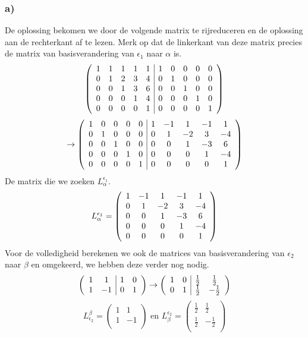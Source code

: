 \documentclass[lineaire_algebra_oplossingen.tex]{subfiles}
\begin{document}
\subsubsection*{a)}
De oplossing bekomen we door de volgende matrix te rijreduceren en de oplossing aan de rechterkant af te lezen. Merk op dat de linkerkant van deze matrix precies de matrix van basisverandering van $\epsilon_{1}$ naar $\alpha$ is.
\[
\left(
\begin{array}{c c c c c | c c c c c}
1 & 1 & 1 & 1 & 1 & 1 & 0 & 0 & 0 & 0\\ 
0 & 1 & 2 & 3 & 4 & 0 & 1 & 0 & 0 & 0\\ 
0 & 0 & 1 & 3 & 6 & 0 & 0 & 1 & 0 & 0\\ 
0 & 0 & 0 & 1 & 4 & 0 & 0 & 0 & 1 & 0\\ 
0 & 0 & 0 & 0 & 1 & 0 & 0 & 0 & 0 & 1\\ 
\end{array}
\right)
\]
\[
\rightarrow
\left(
\begin{array}{c c c c c | c c c c c}
1 & 0 & 0 & 0 & 0 & 1 & -1 & 1 & -1 & 1 \\ 
0 & 1 & 0 & 0 & 0 & 0 & 1 & -2 & 3 & -4\\ 
0 & 0 & 1 & 0 & 0 & 0 & 0 & 1 & -3 & 6\\ 
0 & 0 & 0 & 1 & 0 & 0 & 0 & 0 & 1 & -4\\ 
0 & 0 & 0 & 0 & 1 & 0 & 0 & 0 & 0 & 1\\ 
\end{array}
\right)
\]
De matrix die we zoeken $L_\alpha^{\epsilon_{1}}$.
\[
L_\alpha^{\epsilon_{1}}
=
\left(
\begin{array}{c c c c c}
1 & -1 & 1 & -1 & 1 \\ 
0 & 1 & -2 & 3 & -4\\ 
0 & 0 & 1 & -3 & 6\\ 
0 & 0 & 0 & 1 & -4\\ 
0 & 0 & 0 & 0 & 1\\ 
\end{array}
\right)
\]
Voor de volledigheid berekenen we ook de matrices van basisverandering van $\epsilon_{2}$ naar $\beta$ en omgekeerd, we hebben deze verder nog nodig.
\[
\left(
\begin{array}{c c | c c}
1 & 1 & 1 & 0\\ 
1 & -1 & 0 & 1\\ 
\end{array}
\right)
\rightarrow
\left(
\begin{array}{c c | c c}
1 & 0 & \frac{1}{2} & \frac{1}{2}\\ 
0 & 1 & \frac{1}{2} & -\frac{1}{2}\\ 
\end{array}
\right)
\]
\[
L_{\epsilon_{2}}^\beta =
\begin{pmatrix}
1 & 1\\ 
1 & -1\\
\end{pmatrix}
\text{ en }
L_\beta^{\epsilon_{2}} =
\begin{pmatrix}
\frac{1}{2} & \frac{1}{2}\\ 
\frac{1}{2} & -\frac{1}{2}\\ 
\end{pmatrix}
\]
\end{document}
